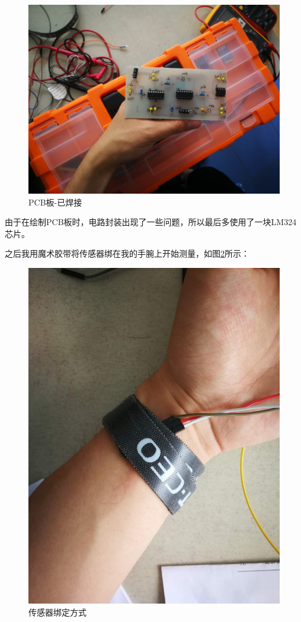 \documentclass{article}
\begin{document}
\begin{spacing}{1.5}
    \begin{figure}[H]
        \centering
        \includegraphics[scale=0.1]{fig/result/PCB2.png}
        \caption{PCB板-已焊接}
        \label{fig:PCB2}
    \end{figure}
    
    由于在绘制PCB板时，电路封装出现了一些问题，所以最后多使用了一块LM324芯片。

    之后我用魔术胶带将传感器绑在我的手腕上开始测量，如图\ref{fig:pulse1}所示：
    \begin{figure}[H]
        \centering
        \includegraphics[scale=0.1]{fig/result/pulse1.png}
        \caption{传感器绑定方式}
        \label{fig:pulse1}
    \end{figure}
    

\end{spacing}
\end{document}
